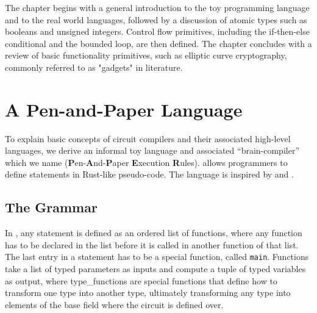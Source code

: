 The chapter begins with a general introduction to the toy programming language and to the real world languages, followed by a discussion of atomic types such as booleans and unsigned integers. Control flow primitives, including the if-then-else conditional and the bounded loop, are then defined. The chapter concludes with a review of basic functionality primitives, such as elliptic curve cryptography, commonly referred to as "gadgets" in literature.

\section{A Pen-and-Paper Language} To explain basic concepts of circuit compilers and their associated high-level languages, we derive an informal toy language and associated ``brain-compiler'' which we name  (\textbf{P}en-\textbf{A}nd-\textbf{P}aper \textbf{E}xecution \textbf{R}ules).  allows programmers to define statements in Rust-like pseudo-code. The language is inspired by  and .
 
\subsection{The Grammar}
In , any statement is defined as an ordered list of functions, where any function has to be declared in the list before it is called in another function of that list. The last entry in a statement has to be a special function, called \texttt{main}. Functions take a list of typed parameters as inputs and compute a tuple of typed variables as output, where type\_functions are special functions that define how to transform one type into another type, ultimately transforming any type into elements of the base field where the circuit is defined over. 

